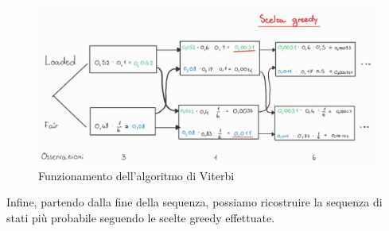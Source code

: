 \begin{itemize}
\begin{esempio}
\begin{figure}[!ht]
                  \includegraphics[width=.5\textwidth]{img/catene/viterbi.png}
                  \caption{Funzionamento dell'algoritmo di Viterbi}
                  \label{fig:viterbi}
              \end{figure}
              Infine, partendo dalla fine della sequenza, possiamo ricostruire la
              sequenza di stati più probabile seguendo le scelte greedy effettuate.
          \end{esempio}
\end{itemize}